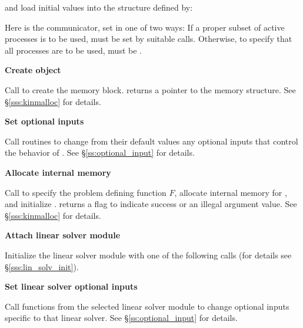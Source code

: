 \begin{Steps}
  and load initial values into the structure defined by:

  {\s} 

  {\p} 

  Here  is the {\mpi} communicator, set in one of two ways: 
  If a proper subset of active processes is to be used,  
  must be set by suitable {\mpi} calls. Otherwise, to specify that all 
  processes are to be used,  must be .
  
\item\label{i:kinsol_create} 
  {\bf Create {\kinsol} object}

  Call  
  to create the {\kinsol} memory block.
   returns a pointer to the {\kinsol} memory structure.
  See \S\ref{sss:kinmalloc} for details.

\item
  {\bf Set optional inputs}

  Call  routines to change from their default values any
  optional inputs that control the behavior of {\kinsol}.
  See \S\ref{ss:optional_input} for details.

\item\label{i:kinsol_malloc} 
  {\bf Allocate internal memory}

  Call  
  to specify the problem defining function $F$,
  allocate internal memory for {\kinsol}, 
  and initialize {\kinsol}.
   returns a flag to indicate success or an illegal argument value.
  See \S\ref{sss:kinmalloc} for details.

\item\label{i:lin_solver} 
  {\bf Attach linear solver module}

  Initialize the linear solver module with one of the following calls
  (for details see \S\ref{sss:lin_solv_init}).

  {\s} 

  {\s} 

  
  
  
\item
  {\bf Set linear solver optional inputs}

  Call  functions from the selected linear solver module to
  change optional inputs specific to that linear solver.
  See \S\ref{ss:optional_input} for details.


\end{Steps}
